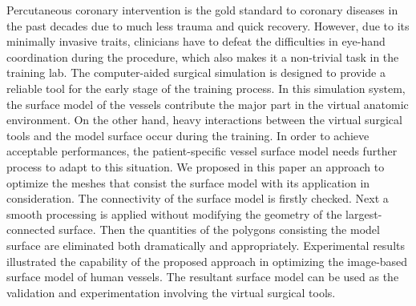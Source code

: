 
Percutaneous coronary intervention is the gold standard to coronary diseases in the past decades due to much less trauma and quick recovery.
However, due to its minimally invasive traits, clinicians have to defeat the difficulties in eye-hand coordination during the procedure, which also makes it a non-trivial task in the training lab. %
The computer-aided surgical simulation is designed to provide a reliable tool for the early stage of the training process.
In this simulation system, the surface model of the vessels contribute the major part in the virtual anatomic environment.
On the other hand, heavy interactions between the virtual surgical tools and the model surface occur during the training.
In order to achieve acceptable performances, the patient-specific vessel surface model needs further process to adapt to this situation.
We proposed in this paper an approach to optimize the meshes that consist the surface model with its application in consideration.
The connectivity of the surface model is firstly checked.
Next a smooth processing is applied without modifying the geometry of the largest-connected surface.
Then the quantities of the polygons consisting the model surface are eliminated both dramatically and appropriately.
Experimental results illustrated the capability of the proposed approach in optimizing the image-based surface model of human vessels.
The resultant surface model can be used as the validation and experimentation involving the virtual surgical tools.